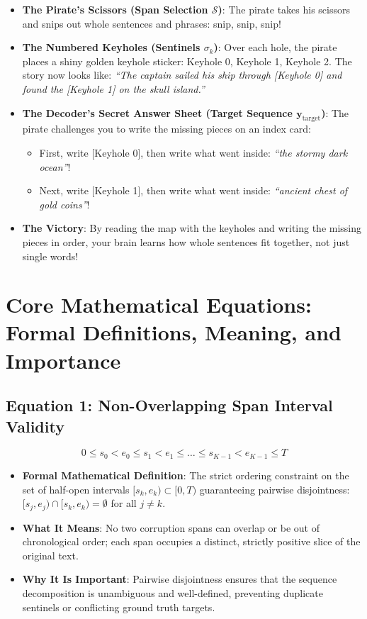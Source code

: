 \documentclass[11pt,a4paper]{article}
\theoremstyle{definition}
\begin{document}
\begin{itemize}
    \item \textbf{The Pirate's Scissors (Span Selection $\mathcal{S}$)}:
    The pirate takes his scissors and snips out whole sentences and phrases: snip, snip, snip!
    
    \item \textbf{The Numbered Keyholes (Sentinels $\sigma_k$)}:
    Over each hole, the pirate places a shiny golden keyhole sticker: Keyhole 0, Keyhole 1, Keyhole 2.
    The story now looks like:
    \emph{``The captain sailed his ship through [Keyhole 0] and found the [Keyhole 1] on the skull island.''}
    
    \item \textbf{The Decoder's Secret Answer Sheet (Target Sequence $\mathbf{y}_{\text{target}}$)}:
    The pirate challenges you to write the missing pieces on an index card:
    \begin{itemize}
        \item First, write [Keyhole 0], then write what went inside: \emph{``the stormy dark ocean''}!
        \item Next, write [Keyhole 1], then write what went inside: \emph{``ancient chest of gold coins''}!
    \end{itemize}
    
    \item \textbf{The Victory}:
    By reading the map with the keyholes and writing the missing pieces in order, your brain learns how whole sentences fit together, not just single words!
\end{itemize}

\section{Core Mathematical Equations: Formal Definitions, Meaning, and Importance}

\subsection{\textbf{Equation 1: Non-Overlapping Span Interval Validity}}
{\boldmath
\begin{equation}
0 \le s_0 < e_0 \le s_1 < e_1 \le \dots \le s_{K-1} < e_{K-1} \le T
\end{equation}
}
\begin{itemize}
    \item \textbf{Formal Mathematical Definition}:
    The strict ordering constraint on the set of half-open intervals $[s_k, e_k) \subset [0, T)$ guaranteeing pairwise disjointness: $[s_j, e_j) \cap [s_k, e_k) = \emptyset$ for all $j \ne k$.
    \item \textbf{What It Means}:
    No two corruption spans can overlap or be out of chronological order; each span occupies a distinct, strictly positive slice of the original text.
    \item \textbf{Why It Is Important}:
    Pairwise disjointness ensures that the sequence decomposition is unambiguous and well-defined, preventing duplicate sentinels or conflicting ground truth targets.
\end{itemize}
\end{document}
